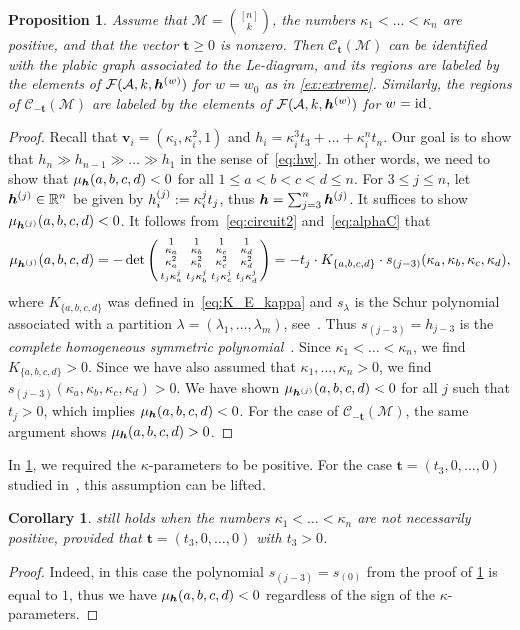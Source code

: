 \documentclass[11pt]{amsart}
\theoremstyle{plain}
\newtheorem{proposition}[theorem]{Proposition}
\newtheorem{corollary}[theorem]{Corollary}
\theoremstyle{definition}
\def\R{\mathbb{R}}
\def\v{{\bm{v}}}
\def\t{{\bm{t}}}
\def\h{{\bm{h}}}
\begin{document}
\begin{proposition}\label{prop:time_positive}
	Assume that $\mathcal{M} = {[n] \choose k}$, the numbers $\kappa_1<\dots<\kappa_n$ are positive, and that the vector $\t\geq0$ is nonzero. Then $\mathcal{C}_{\t}(\mathcal{M})$ can be identified with the plabic graph associated to the Le-diagram, and its regions are labeled by the elements of $\Compatw$ for $w=w_0$  as in \cref{ex:extreme}. Similarly, the regions of $\mathcal{C}_{-\t}(\mathcal{M})$ are labeled by the elements of $\Compatw$ for $w=\operatorname{id}$.
\end{proposition}
\begin{proof} Recall that $\v_i = (\kappa_i, \kappa_i^2, 1)$ and $h_i=\kappa_i^3t_3+\dots+\kappa_i^n t_n$. Our goal is to show that $h_n\gg h_{n-1} \gg\dots \gg h_1$ in the sense of~\eqref{eq:hw}. In other words, we need to show that $\muh(a,b,c,d)<0$ for all $1\leq a<b<c<d\leq n$. For $3\leq j\leq n$, let $\hj\in\R^n$ be given by ${h_i^{(j)}}:=\kappa_i^j t_j$, thus $\h=\sum_{j=3}^n\hj$. It suffices to show $\mu_{\hj}(a,b,c,d)<0$. It follows from~\eqref{eq:circuit2} and~\eqref{eq:alphaC} that 
  \[\mu_{\hj}(a,b,c,d)=-\det \left(\begin{smallmatrix}
1&1&1&1\\
\kappa_a&\kappa_b&\kappa_c&\kappa_d\\
\kappa_a^2&\kappa_b^2&\kappa_c^2&\kappa_d^2\\
t_j\kappa_a^j&t_j\kappa_b^j&t_j\kappa_c^j&t_j\kappa_d^j\\
        \end{smallmatrix}\right)=-t_j\cdot K_{\{a,b,c,d\}}\cdot s_{(j-3)}(\kappa_a, \kappa_b,\kappa_c,\kappa_d),\] 
where $K_{\{a,b,c,d\}}$ was defined in~\eqref{eq:K_E_kappa} and $s_\lambda$ is the Schur polynomial associated with a partition $\lambda=(\lambda_1,\dots,\lambda_m)$, see~\cite[\S7.15]{EC2}. Thus $s_{(j-3)}=h_{j-3}$ is the \emph{complete homogeneous symmetric polynomial}~\cite[\S7.5]{EC2}. Since $\kappa_1<\dots<\kappa_n$, we find $K_{\{a,b,c,d\}}>0$. Since we have also assumed that $\kappa_1,\dots,\kappa_n>0$, we find $s_{(j-3)}(\kappa_a, \kappa_b,\kappa_c,\kappa_d)>0$. We have shown $\mu_{\hj}(a,b,c,d)<0$ for all $j$ such that $t_j>0$, which implies $\muh(a,b,c,d)<0$. For the case of $\mathcal{C}_{-\t}(\mathcal{M})$, the same argument shows  $\muh(a,b,c,d)>0$.
\end{proof}

In \cref{prop:time_positive}, we required the $\kappa$-parameters to be positive. For the case $\t = (t_3,0,\dots,0)$ studied in~\cite{KW2}, this assumption can be lifted.
\begin{corollary}\label{cor:time_positive}
 still holds when the numbers $\kappa_1<\dots<\kappa_n$ are not necessarily positive, provided that $\t = (t_3,0,\dots,0)$ with $t_3>0$.
\end{corollary}
\begin{proof}
Indeed, in this case the polynomial $s_{(j-3)}=s_{(0)}$ from the proof of \cref{prop:time_positive} is equal to $1$, thus we have $\muh(a,b,c,d)<0$ regardless of the sign of the $\kappa$-parameters.
\end{proof}
\end{document}
